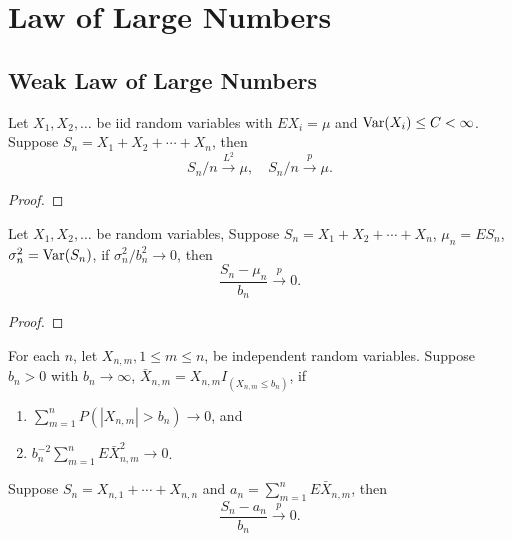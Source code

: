 \chapter{Law of Large Numbers}

\section{Weak Law of Large Numbers}

\begin{theorem}
	Let \(X_1,X_2,\ldots\) be iid random variables with \(EX_i=\mu\) and \(\mathrm{Var}(X_i)\leq C<\infty\). Suppose \(S_n=X_1+X_2+\cdots+X_n\), then
	\begin{equation}
		S_n/n\stackrel{L^2}{\rightarrow}\mu,\quad S_n/n\stackrel{p}{\rightarrow}\mu.
	\end{equation}
\end{theorem}

\begin{proof}

\end{proof}

\begin{theorem}
	Let \(X_1,X_2,\ldots\) be random variables, Suppose \(S_n=X_1+X_2+\cdots+X_n\), \(\mu_n=ES_n\), \(\sigma_n^2=\mathrm{Var}(S_n)\), if \(\sigma_n^2/b_n^2\rightarrow 0\), then
	\begin{equation}
		\frac{S_n-\mu_n}{b_n}\stackrel{p}{\rightarrow}0.
	\end{equation}
\end{theorem}

\begin{proof}

\end{proof}

\begin{theorem}
	For each \(n\), let \(X_{n,m},1\leq m\leq n\), be independent random variables. Suppose \(b_n>0\) with \(b_n\rightarrow\infty\), \(\bar{X}_{n,m}=X_{n,m}I_{\left(X_{n,m}\leq b_n\right)}\), if
	\begin{enumerate}
		\item \(\sum_{m=1}^{n}P\left(\left|X_{n,m}\right|>b_{n}\right)\rightarrow 0\), and
		\item \(b_{n}^{-2}\sum_{m=1}^{n}E\bar{X}_{n,m}^{2}\rightarrow 0\).
	\end{enumerate}
	Suppose \(S_{n}=X_{n, 1}+\cdots+X_{n,n}\) and \(a_{n}=\sum_{m=1}^{n}E\bar{X}_{n,m}\), then
	\begin{equation}
		\frac{S_n-a_n}{b_n}\stackrel{p}{\rightarrow}0.
	\end{equation}
\end{theorem}

